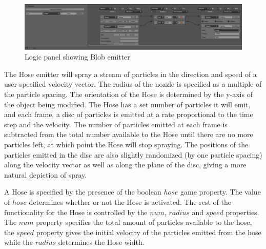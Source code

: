 \begin{figure}[!htc]
 		\centering
		\includegraphics[scale=0.22]{figures/ui_emitter.png}
        \caption{ Logic panel showing Blob emitter }
		\label{fig:ui_emitter}
\end{figure}



The Hose emitter will spray a stream of particles in the direction and speed of
a user-specified velocity vector. The radius of the nozzle is specified as a
multiple of the particle spacing. The orientation of the Hose is determined by
the y-axis of the object being modified. The Hose has a set number of particles
it will emit, and each frame, a disc of particles is emitted at a rate
proportional to the time step and the velocity. The number of particles emitted
at each frame is subtracted from the total number available to the Hose until
there are no more particles left, at which point the Hose will stop spraying.
The positions of the particles emitted in the disc are also slightly randomized
(by one particle spacing) along the velocity vector as well as along the plane
of the disc, giving a more natural depiction of spray.

A Hose is specified by the presence of the boolean $hose$ game property. The
value of $hose$ determines whether or not the Hose is activated.
The rest of the functionality for the Hose is controlled by the $num$, $radius$
and $speed$ properties. The $num$ property specifies the total amount of
particles available to the hose, the $speed$ property gives the initial
velocity of the particles emitted from the hose while the $radius$ determines
the Hose width. 

